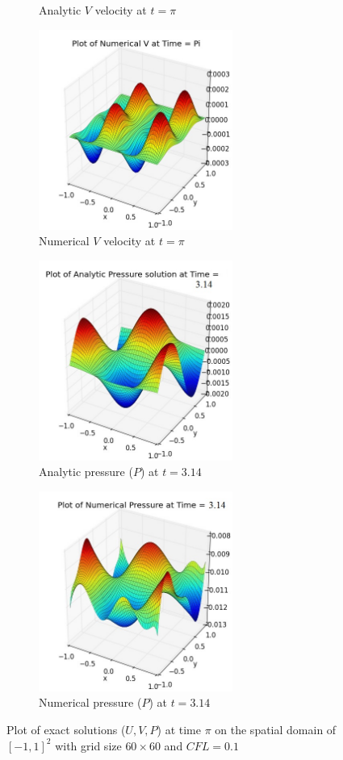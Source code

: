 \begin{figure}[H]
\begin{subfigure}[t]{2.5in}
		\caption{Analytic $V$ velocity at $t=\pi$}\label{fig:6.1b}
	\end{subfigure}
	\quad
	\begin{subfigure}[t]{2.5in}
		\centering
		\includegraphics[width=2.5in]{figures/Pm1b_pf2_vf_t_pi_grid_60_0_05.jpg}
		\caption{Numerical $V$ velocity at $t=\pi$}\label{fig:6.1b}
	\end{subfigure}
	\quad	
	\begin{subfigure}[t]{2.5in}
		\centering
		\includegraphics[width=2.5in]{figures/Pm1b_pf2_P_exact_t_pi_grid_60_cfl_0_1.jpg}
		\caption{Analytic pressure ($P$) at $t=3.14$}\label{fig:6.1b}
	\end{subfigure}
	\quad	
	\begin{subfigure}[t]{2.5in}
		\centering
		\includegraphics[width=2.5in]{figures/Pm1b_pf2_pf_t_pi_grid_60_cfl_0_1.jpg}
		\caption{Numerical pressure ($P$) at $t=3.14$}\label{fig:6.1b}
	\end{subfigure}
	\caption{Plot of exact solutions ($U,V,P$) at time $\pi$ on the spatial domain of $[-1,1]^2$ with grid size $60 \times 60$ and $CFL=0.1$}\label{fig:6.1}
\end{figure}

